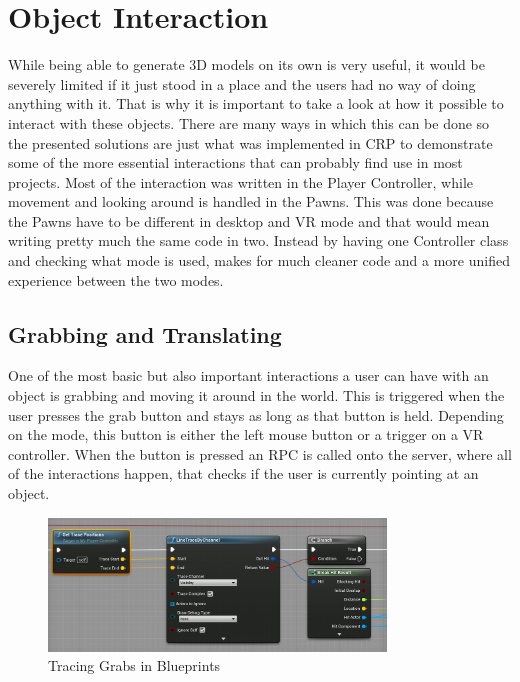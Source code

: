 
\section{Object Interaction}\label{chp:ObjectInteraction}
While being able to generate 3D models on its own is very useful, it would be severely limited if it just stood in a place and the users had no way of doing anything with it. That is why it is important to take a look at how it possible to interact with these objects. There are many ways in which this can be done so the presented solutions are just what was implemented in CRP to demonstrate some of the more essential interactions that can probably find use in most projects.
Most of the interaction was written in the Player Controller, while movement and looking around is handled in the Pawns. This was done because the Pawns have to be different in desktop and VR mode and that would mean writing pretty much the same code in two. Instead by having one Controller class and checking what mode is used, makes for much cleaner code and a more unified experience between the two modes.
\subsection{Grabbing and Translating}

One of the most basic but also important interactions a user can have with an object is grabbing and moving it around in the world. This is triggered when the user presses the grab button and stays as long as that button is held. Depending on the mode, this button is either the left mouse button or a trigger on a VR controller. When the button is pressed an RPC is called onto the server, where all of the interactions happen, that checks if the user is currently pointing at an object. 

\begin{figure}[htpb]
	\centering
	\includegraphics[width=0.8\textwidth]{fig/LineTracing.png}
	\caption[Tracing Grabs in Blueprints]{Tracing Grabs in Blueprints\protect}
	\label{fig:LineTracing}
\end{figure}
